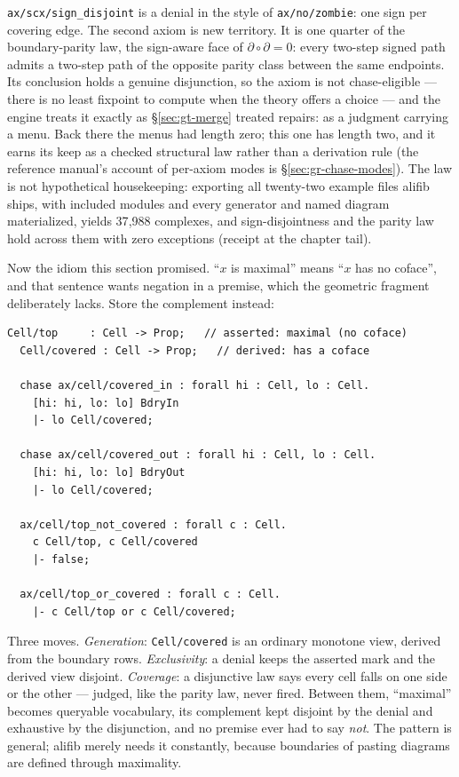 \noindent \texttt{ax/scx/sign\_disjoint} is a denial in the style of
\texttt{ax/no/zombie}: one sign per covering edge. The second axiom is
new territory. It is one quarter of the boundary-parity law, the
sign-aware face of $\partial \circ \partial = 0$: every two-step
signed path admits a two-step path of the opposite parity class
between the same endpoints. Its conclusion holds a genuine
disjunction, so the axiom is not chase-eligible --- there is no least
fixpoint to compute when the theory offers a choice --- and the engine
treats it exactly as \S\ref{sec:gt-merge} treated repairs: as a
judgment carrying a menu. Back there the menus had length zero; this
one has length two, and it earns its keep as a checked structural law
rather than a derivation rule (the reference manual's account of
per-axiom modes is \S\ref{sec:gr-chase-modes}). The law is not
hypothetical housekeeping: exporting all twenty-two example files
alifib ships, with included modules and every generator and named
diagram materialized, yields 37{,}988 complexes, and sign-disjointness
and the parity law hold across them with zero exceptions (receipt at
the chapter tail).

Now the idiom this section promised. ``$x$ is maximal'' means ``$x$
has no coface'', and that sentence wants negation in a premise, which
the geometric fragment deliberately lacks. Store the complement
instead:

\begin{Verbatim}[fontsize=\small,frame=leftline,rulecolor=\color{accentmid},framesep=3mm,xleftmargin=3mm]
  Cell/top     : Cell -> Prop;   // asserted: maximal (no coface)
  Cell/covered : Cell -> Prop;   // derived: has a coface

  chase ax/cell/covered_in : forall hi : Cell, lo : Cell.
    [hi: hi, lo: lo] BdryIn
    |- lo Cell/covered;

  chase ax/cell/covered_out : forall hi : Cell, lo : Cell.
    [hi: hi, lo: lo] BdryOut
    |- lo Cell/covered;

  ax/cell/top_not_covered : forall c : Cell.
    c Cell/top, c Cell/covered
    |- false;

  ax/cell/top_or_covered : forall c : Cell.
    |- c Cell/top or c Cell/covered;
\end{Verbatim}

\noindent Three moves. \emph{Generation}: \texttt{Cell/covered} is an
ordinary monotone view, derived from the boundary rows.
\emph{Exclusivity}: a denial keeps the asserted mark and the derived
view disjoint. \emph{Coverage}: a disjunctive law says every cell
falls on one side or the other --- judged, like the parity law, never
fired. Between them, ``maximal'' becomes queryable vocabulary, its
complement kept disjoint by the denial and exhaustive by the
disjunction, and no premise ever had to say \emph{not}. The pattern is
general; alifib merely needs it constantly, because boundaries of
pasting diagrams are defined through maximality.


